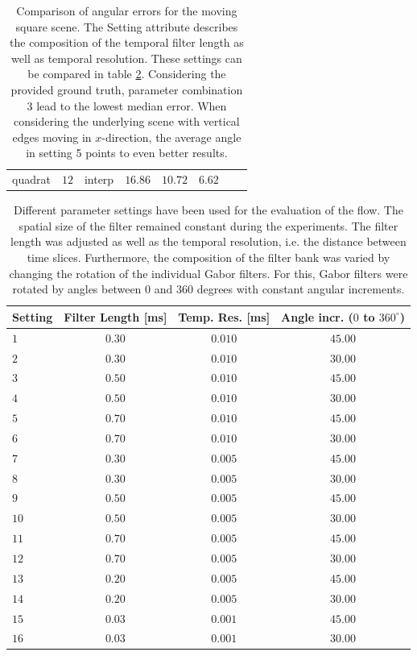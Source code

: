 \begin{table}[tb]
\begin{tabular}{lccccccc}
quadrat & $12$ & interp & $16.86$ & $10.72$ & $6.62$ &  & \\
		\end{tabular}
	\caption[First scene: Comparison of angular errors for different parameters.]{Comparison of angular errors for the moving square scene.
	The Setting attribute describes the composition of the temporal filter length as well as temporal resolution.
	 These settings can be compared in table \ref{tab:parameter_settings}. Considering the provided ground truth, parameter combination 3 lead to the lowest median error. When considering the underlying scene with vertical edges moving in $x$-direction, the average angle in setting 5 points to even better results.}
	\label{tab:error_comparison_square}
\end{table}

\begin{table}[tb]
	\centering
		\begin{tabular}{lccc}
Setting & Filter Length [ms] & Temp. Res. [ms] & Angle incr. ($0$ to $360^\circ$) \\
\hline  \hline
$1$ & $0.30$ & $0.010$ & $45.00$\\
$2$ & $0.30$ & $0.010$ & $30.00$\\
$3$ & $0.50$ & $0.010$ & $45.00$\\
$4$ & $0.50$ & $0.010$ & $30.00$\\
$5$ & $0.70$ & $0.010$ & $45.00$\\
$6$ & $0.70$ & $0.010$ & $30.00$\\
$7$ & $0.30$ & $0.005$ & $45.00$\\
$8$ & $0.30$ & $0.005$ & $30.00$\\
$9$ & $0.50$ & $0.005$ & $45.00$\\
$10$ & $0.50$ & $0.005$ & $30.00$\\
$11$ & $0.70$ & $0.005$ & $45.00$\\
$12$ & $0.70$ & $0.005$ & $30.00$\\
$13$ & $0.20$ & $0.005$ & $45.00$\\
$14$ & $0.20$ & $0.005$ & $30.00$\\
$15$ & $0.03$ & $0.001$ & $45.00$\\
$16$ & $0.03$ & $0.001$ & $30.00$\\
		\end{tabular}
	\caption[Different parameter settings for the evaluations]{Different parameter settings have been used for the evaluation of the flow.
	 The spatial size of the filter remained constant during the experiments.
	 The filter length was adjusted as well as the temporal resolution, i.e. the distance between time slices. 
	 Furthermore, the composition of the filter bank was varied by changing the rotation of the individual Gabor filters. 
	 For this, Gabor filters were rotated by angles between $0$ and $360$ degrees with constant angular increments.}
	\label{tab:parameter_settings}
\end{table}


